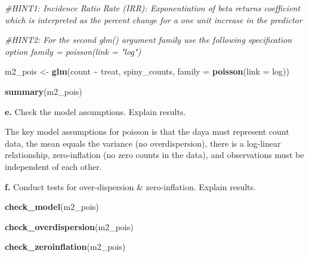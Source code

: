 \documentclass[
]{article}
\newenvironment{Shaded}{\begin{snugshade}}{\end{snugshade}}
\newcommand{\AttributeTok}[1]{\textcolor[rgb]{0.13,0.29,0.53}{#1}}
\newcommand{\CommentTok}[1]{\textcolor[rgb]{0.56,0.35,0.01}{\textit{#1}}}
\newcommand{\FunctionTok}[1]{\textcolor[rgb]{0.13,0.29,0.53}{\textbf{#1}}}
\newcommand{\NormalTok}[1]{#1}
\newcommand{\OtherTok}[1]{\textcolor[rgb]{0.56,0.35,0.01}{#1}}
\newcommand{\SpecialCharTok}[1]{\textcolor[rgb]{0.81,0.36,0.00}{\textbf{#1}}}
\newcommand{\StringTok}[1]{\textcolor[rgb]{0.31,0.60,0.02}{#1}}
\begin{document}
\begin{Shaded}
\begin{Highlighting}[]
\CommentTok{\#HINT1: Incidence Ratio Rate (IRR): Exponentiation of beta returns coefficient which is interpreted as the \textquotesingle{}percent change\textquotesingle{} for a one unit increase in the predictor }

\CommentTok{\#HINT2: For the second glm() argument \textasciigrave{}family\textasciigrave{} use the following specification option \textasciigrave{}family = poisson(link = "log")\textasciigrave{}}

\NormalTok{m2\_pois }\OtherTok{\textless{}{-}} \FunctionTok{glm}\NormalTok{(count }\SpecialCharTok{\textasciitilde{}}\NormalTok{ treat, spiny\_counts, }\AttributeTok{family =} \FunctionTok{poisson}\NormalTok{(}\AttributeTok{link =} \StringTok{\textquotesingle{}log\textquotesingle{}}\NormalTok{))}

\FunctionTok{summary}\NormalTok{(m2\_pois)}
\end{Highlighting}
\end{Shaded}

\textbf{e.} Check the model assumptions. Explain results.

The key model assumptions for poisson is that the daya must represent
count data, the mean equals the variance (no overdispersion), there is a
log-linear relationship, zero-inflation (no zero counts in the data),
and observations must be independent of each other.

\textbf{f.} Conduct tests for over-dispersion \& zero-inflation. Explain
results.

\begin{Shaded}
\begin{Highlighting}[]
\FunctionTok{check\_model}\NormalTok{(m2\_pois)}
\end{Highlighting}
\end{Shaded}

\begin{Shaded}
\begin{Highlighting}[]
\FunctionTok{check\_overdispersion}\NormalTok{(m2\_pois)}
\end{Highlighting}
\end{Shaded}

\begin{Shaded}
\begin{Highlighting}[]
\FunctionTok{check\_zeroinflation}\NormalTok{(m2\_pois)}
\end{Highlighting}
\end{Shaded}
\end{document}
